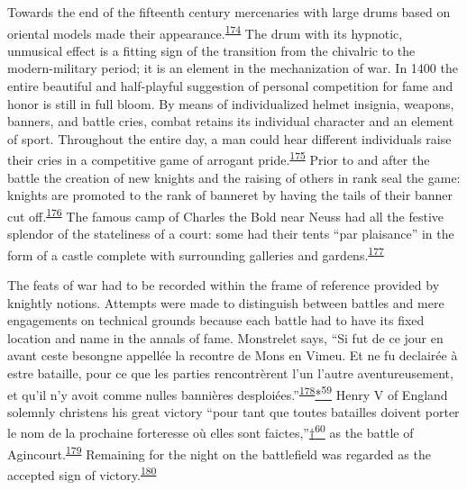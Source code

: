 Towards the end of the fifteenth century mercenaries with large drums
based on oriental models made their
appearance.\textsuperscript{\protect\hypertarget{10_Chapter_Three__THE_HEROIC_DREAM.xhtmlux5cux23id_1588}{\protect\hyperlink{23_NOTES.xhtmlux5cux23id_1589}{174}}}
The drum with its hypnotic, unmusical effect is a fitting sign of the
transition from the chivalric to the modern-military period; it is an
element in the mechanization of war. In 1400 the entire beautiful and
half-playful suggestion of personal competition for fame and honor is
still in full bloom. By means of individualized helmet insignia,
weapons, banners, and battle cries, combat retains its individual
character and an element of sport. Throughout the entire day, a man
could hear different individuals raise their cries in a competitive game
of arrogant
pride.\textsuperscript{\protect\hypertarget{10_Chapter_Three__THE_HEROIC_DREAM.xhtmlux5cux23id_1586}{\protect\hyperlink{23_NOTES.xhtmlux5cux23id_1587}{175}}}
Prior to and after the battle the creation of new knights and the
raising of others in rank seal the game: knights are promoted to the
rank of banneret by having the tails of their banner cut
off.\textsuperscript{\protect\hypertarget{10_Chapter_Three__THE_HEROIC_DREAM.xhtmlux5cux23id_1584}{\protect\hyperlink{23_NOTES.xhtmlux5cux23id_1585}{176}}}
The famous camp of Charles the Bold near Neuss had all the festive
splendor of the stateliness of a court: some had their tents ``par
plaisance'' in the form of a castle complete with surrounding galleries
and
gardens.\textsuperscript{\protect\hypertarget{10_Chapter_Three__THE_HEROIC_DREAM.xhtmlux5cux23id_1582}{\protect\hyperlink{23_NOTES.xhtmlux5cux23id_1583}{177}}}

The feats of war had to be recorded within the frame of reference
provided by knightly notions. Attempts were made to distinguish between
battles and mere engagements on technical grounds because each battle
had to have its fixed location and name in the annals of fame.
Monstrelet says, ``Si fut de ce jour en avant ceste besongne appellée la
recontre de Mons en Vimeu. Et ne fu declairée à estre bataille, pour ce
que les parties rencontrèrent l'un l'autre aventureusement, et qu'il n'y
avoit comme nulles bannières
desploiées.''\textsuperscript{\protect\hypertarget{10_Chapter_Three__THE_HEROIC_DREAM.xhtmlux5cux23id_1580}{\protect\hyperlink{23_NOTES.xhtmlux5cux23id_1581}{178}}}\protect\hypertarget{10_Chapter_Three__THE_HEROIC_DREAM.xhtmlux5cux23id_2905}{\protect\hyperlink{23_NOTES.xhtmlux5cux23id_2906}{*\textsuperscript{59}}}
Henry V of England solemnly christens his great victory ``pour tant que
toutes batailles doivent porter le nom de la prochaine forteresse où
elles sont
faictes,''\protect\hypertarget{10_Chapter_Three__THE_HEROIC_DREAM.xhtmlux5cux23id_2907}{\protect\hyperlink{23_NOTES.xhtmlux5cux23id_2908}{†\textsuperscript{60}}}
as the battle of
Agincourt.\textsuperscript{\protect\hypertarget{10_Chapter_Three__THE_HEROIC_DREAM.xhtmlux5cux23id_1578}{\protect\hyperlink{23_NOTES.xhtmlux5cux23id_1579}{179}}}
Remaining for the night on the battlefield was regarded as the accepted
sign of
victory.\textsuperscript{\protect\hypertarget{10_Chapter_Three__THE_HEROIC_DREAM.xhtmlux5cux23id_1576}{\protect\hyperlink{23_NOTES.xhtmlux5cux23id_1577}{180}}}

